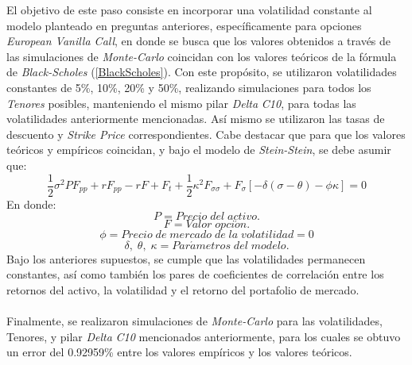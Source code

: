 \noindent El objetivo de este paso consiste en incorporar una volatilidad constante al modelo planteado en preguntas anteriores, específicamente para opciones \textit{European Vanilla Call}, en donde se busca que los valores obtenidos a través de las simulaciones de \textit{Monte-Carlo} coincidan con los valores teóricos de la fórmula de \textit{Black-Scholes} (\ref{BlackScholes}). Con este propósito, se utilizaron volatilidades constantes de 5\%, 10\%, 20\% y 50\%, realizando simulaciones para todos los \textit{Tenores} posibles, manteniendo el mismo pilar \textit{Delta} \textit{C10}, para todas las volatilidades anteriormente mencionadas. Así mismo se utilizaron las tasas de descuento y \textit{Strike Price} correspondientes. Cabe destacar que para que los valores teóricos y empíricos coincidan, y bajo el modelo de \textit{Stein-Stein}, se debe asumir que:
\begin{equation}
    \frac{1}{2}\sigma^2 P F_{pp}+ rF_{pp}-rF+F_t+\frac{1}{2}\kappa^2 F_{\sigma \sigma} +F_{\sigma} \left[-\delta(\sigma-\theta)-\phi \kappa \right]=0
    \label{CondicionVol}
\end{equation}
\noindent En donde:
\begin{equation*}
    P=Precio\;del\;activo.
\end{equation*}
\begin{equation*}
    F=Valor\; opci\acute{o}n.
\end{equation*}
\begin{equation*}
    \phi=Precio\;de\;mercado\;de\;la\;volatilidad=0
\end{equation*}
\begin{equation*}
    \delta,\;\theta,\;\kappa = Par\acute{a}metros\;del\;modelo.
\end{equation*}
\noindent Bajo los anteriores supuestos, se cumple que las volatilidades permanecen constantes, así como también los pares de coeficientes de correlación entre los retornos del activo, la volatilidad y el retorno del portafolio de mercado.\\\\
\noindent Finalmente, se realizaron simulaciones de \textit{Monte-Carlo} para las volatilidades, Tenores, y pilar \textit{Delta} \textit{C10} mencionados anteriormente, para los cuales se obtuvo un error del 0.92959\% entre los valores empíricos y los valores teóricos.
\newpage

